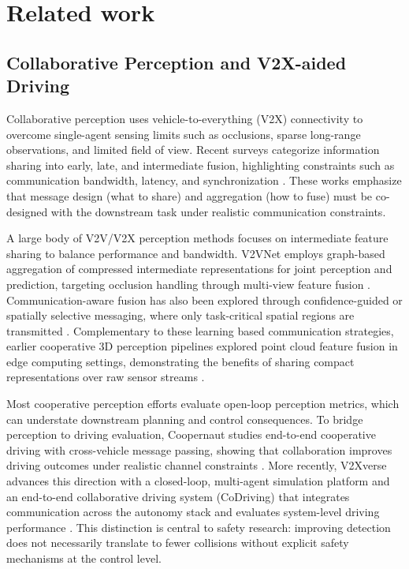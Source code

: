 \section{Related work}\label{Related_work}

\subsection{Collaborative Perception and V2X-aided Driving}
Collaborative perception uses vehicle-to-everything (V2X) connectivity to overcome single-agent sensing limits such as occlusions, sparse long-range observations, and limited field of view. Recent surveys categorize information sharing into early, late, and intermediate fusion, highlighting constraints such as communication bandwidth, latency, and synchronization \cite{teufel2024collective,han2023collaborative,huang2023v2xsurvey}. These works emphasize that message design (what to share) and aggregation (how to fuse) must be co-designed with the downstream task under realistic communication constraints.

A large body of V2V/V2X perception methods focuses on intermediate feature sharing to balance performance and bandwidth. V2VNet employs graph-based aggregation of compressed intermediate representations for joint perception and prediction, targeting occlusion handling through multi-view feature fusion \cite{wang2020v2vnet}. Communication-aware fusion has also been explored through confidence-guided or spatially selective messaging, where only task-critical spatial regions are transmitted \cite{HuEtAl2022}. Complementary to these learning based communication strategies, earlier cooperative 3D perception pipelines explored point cloud feature fusion in edge computing settings, demonstrating the benefits of sharing compact representations over raw sensor streams \cite{chen2019fcooper,chen2019cooper}.

Most cooperative perception efforts evaluate open-loop perception metrics, which can understate downstream planning and control consequences. To bridge perception to driving evaluation, Coopernaut studies end-to-end cooperative driving with cross-vehicle message passing, showing that collaboration improves driving outcomes under realistic channel constraints \cite{cui2022coopernaut}. More recently, V2Xverse advances this direction with a closed-loop, multi-agent simulation platform and an end-to-end collaborative driving system (CoDriving) that integrates communication across the autonomy stack and evaluates system-level driving performance \cite{liu2024v2xverse}. This distinction is central to safety research: improving detection does not necessarily translate to fewer collisions without explicit safety mechanisms at the control level.

